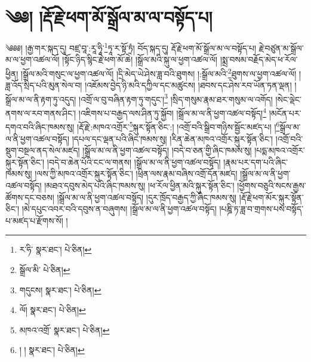 \setcounter{footnote}{0} 
\chapter{༄༅། །རྡོ་རྗེ་ཕག་མོ་སྒྲོལ་མ་ལ་བསྟོད་པ།}༄༅༅། །རྒྱ་གར་སྐད་དུ། བཛྲ་བཱ་:རཱ་ཧཱི་\footnote{ར་ཧི་  སྣར་ཐང་།  པེ་ཅིན། }ཏཱ་ར་སྟོ་ཏྲཾ། བོད་སྐད་དུ། རྡོ་རྗེ་ཕག་མོ་སྒྲོལ་མ་ལ་བསྟོད་པ། རྗེ་བཙུན་མ་སྒྲོལ་མ་ལ་ཕྱག་འཚལ་ལོ། །སྟོང་ཉིད་སྙིང་རྗེ་ཕག་མོ་ཆེ། །སྒྲོལ་མའི་སྐུ་ལ་ཕྱག་འཚལ་ལོ། །སྨྲ་བསམ་བརྗོད་མེད་ཕ་རོལ་ཕྱིན། །སྒྲོལ་མའི་གསུང་ལ་ཕྱག་འཚལ་ལོ། །དྲི་མེད་ཡེ་ཤེས་ཟླ་བའི་ཐུགས། །:སྒྲོལ་མའི་\footnote{སྒྲོལ་མི་  པེ་ཅིན། }ཐུགས་ལ་ཕྱག་འཚལ་ལོ། །ཟླ་འོད་སྲིད་པའི་མུན་སེལ་བ། །འཇོམས་བྱེད་ཉི་མའི་དཀྱིལ་དང་མཚུངས། །ཐབས་དང་ཤེས་རབ་ཡོན་ཏན་ལྡན། །སྒྲོལ་མ་ལ་ནི་རྟག་ཏུ་འདུད། །འགྲོ་ལ་བུ་བཞིན་རྟག་ཏུ་གདུང་།\footnote{གདུངས།  སྣར་ཐང་།  པེ་ཅིན། } །སྲིད་གསུམ་རྣམ་ཐར་གསུམ་ལ་འགོད། །སེང་ལྡེང་ནགས་ལ་རབ་གནས་ཤིང་། །འཇིགས་པ་བརྒྱད་ལས་ཤིན་ཏུ་སྐྱོབ། །སྒྲོལ་མ་ལ་ནི་ཕྱག་འཚལ་བསྟོད།\footnote{ལོ།  སྣར་ཐང་།  པེ་ཅིན། } །མངོན་པར་དགའ་བའི་ཞིང་ཁམས་སུ། །རྡོ་རྗེ་:མཁའ་འགྲོར་\footnote{མཁའ་འགྲོ་  སྣར་ཐང་།  པེ་ཅིན། }སྐུར་སྟོན་ཅིང་:། །འགྲོ་བའི་སྒྲིབ་གཉིས་སྦྱོང་མཛད་པ། །\footnote{། །  སྣར་ཐང་།  པེ་ཅིན། }སྒྲོལ་མ་ལ་ནི་ཕྱག་འཚལ་བསྟོད། །དཔལ་དང་ལྡན་པའི་ཞིང་ཁམས་སུ། །རིན་ཆེན་མཁའ་འགྲོར་སྐུར་སྟོན་ཅིང་། །འགྲོ་བའི་སྡུག་བསྔལ་ནད་སེལ་མཛད། །སྒྲོལ་མ་ལ་ནི་ཕྱག་འཚལ་བསྟོད། །བདེ་བ་ཅན་གྱི་ཞིང་ཁམས་སུ། །པདྨ་མཁའ་འགྲོར་སྐུར་སྟོན་ཅིང་། །བདེ་བ་ཆེན་པོའི་ངང་ལ་གནས། །སྒྲོལ་མ་ལ་ནི་ཕྱག་འཚལ་བསྟོད། །རྣམ་པར་དག་པའི་ཞིང་ཁམས་སུ། །ལས་ཀྱི་མཁའ་འགྲོར་སྐུར་སྟོན་ཅིང་། །ཕྲིན་ལས་རྣམ་བཞིས་འགྲོ་དོན་མཛད། །སྒྲོལ་མ་ལ་ནི་ཕྱག་འཚལ་བསྟོད། །མཐའ་དབུས་མེད་པའི་ཞིང་ཁམས་སུ། །ཕ་རོལ་ཕྱིན་མའི་སྐུར་སྟོན་ཅིང་། །ཕྱོགས་བཅུའི་སངས་རྒྱས་ཚོགས་དང་བཅས། །སྒྲོལ་མ་ལ་ནི་ཕྱག་འཚལ་བསྟོད། །དུར་ཁྲོད་བརྒྱད་ཀྱི་ཞིང་ཁམས་སུ། །རྡོ་རྗེ་ཕག་མོར་སྐུར་སྟོན་ཅིང་། །མེ་དཔུང་འབར་བའི་དབུས་ན་བཞུགས། །སྒྲོལ་མ་ལ་ནི་ཕྱག་འཚལ་བསྟོད། །པཎྜི་ཏ་ཟླ་བ་གྲགས་པས་བསྟོད་པ་མཛད་པ་རྫོགས་སོ། ། 
